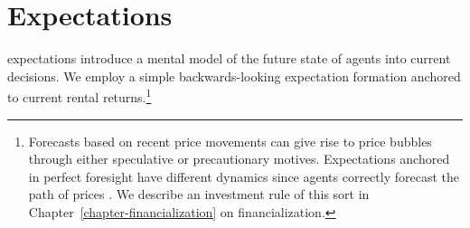 



\section{Expectations}
\Glspl{expectation} introduce a mental model of the future state of agents into current decisions.  We employ a simple backwards-looking expectation formation anchored 
to current rental returns.\footnote{Forecasts based on recent price movements can give rise to \glspl{price bubble} through either speculative or precautionary motives. Expectations anchored in \gls{perfect foresight} have different dynamics since agents correctly forecast the path of prices \cite{muthRationalExpectationsTheory1961}.  We describe an investment rule of this sort in Chapter~\ref{chapter-financialization} on financialization.} 








